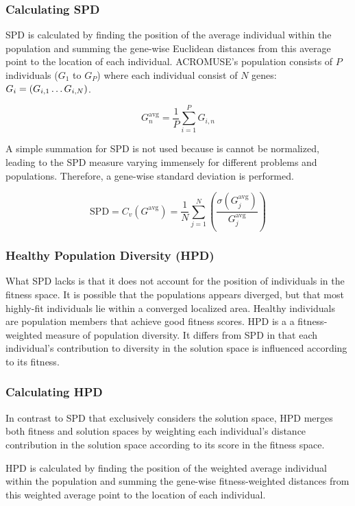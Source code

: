 \documentclass[../main.tex]{subfiles}
\begin{document}
\subsubsection{Calculating SPD}

SPD is calculated by finding the position of the average individual within the population and summing the gene-wise
Euclidean distances from this average point to the location of each individual. ACROMUSE’s population consists of $P$
individuals ($G_1$ to $G_P$) where each individual consist of $N$ genes: $G_i = (G_{i,1} \mathellipsis G_{i,N})$.

\begin{equation}
G_n^{\text{avg}} = \frac{1}{P} \sum_{i=1}^P G_{i,n}
\end{equation}

A simple summation for SPD is not used because is cannot be normalized, leading to the SPD measure varying immensely
for different problems and populations. Therefore, a gene-wise standard deviation is performed.

\begin{equation}
\text{SPD} = C_v(G^{\text{avg}}) = \frac{1}{N} \sum_{j=1}^N \left( \frac{\sigma (G^{\text{avg}}_j)}{G^{\text{avg}}_j}
\right)
\end{equation}

\subsubsection{Healthy Population Diversity (HPD)}
What SPD lacks is that it does not account for the position of individuals in the fitness space. It is possible that
the populations appears diverged, but that most highly-fit individuals lie within a converged localized area. Healthy
individuals are population members that achieve good fitness scores. HPD is a a fitness-weighted measure of population
diversity. It differs from SPD in that each individual's contribution to diversity in the solution space is influenced
according to its fitness.

\subsubsection{Calculating HPD}
In contrast to SPD that exclusively considers the solution space, HPD merges both fitness and solution spaces by
weighting each individual's distance contribution in the solution space according to its score in the fitness space.

HPD is calculated by finding the position of the weighted average individual within the population and summing the
gene-wise fitness-weighted distances from this weighted average point to the location of each individual.
\end{document}
